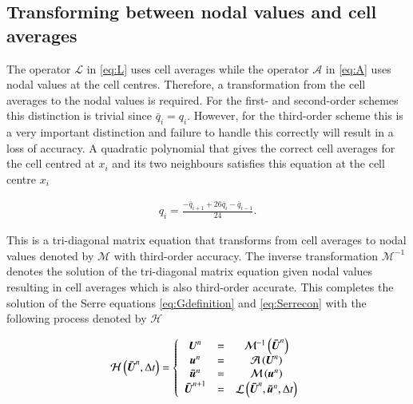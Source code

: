 \documentclass[SingleSpace,12pt]{Serre_ASCE}
\begin{document}
\subsection{Transforming between nodal values and cell averages} %
The operator $\mathcal{L}$ in \eqref{eq:L} uses cell averages while the operator $\mathcal{A}$ in \eqref{eq:A} uses nodal values at the cell centres. Therefore, a transformation from the cell averages to the nodal values is required. For the first- and second-order schemes this distinction is trivial since $\bar{q}_i = q_i$. However, for the third-order scheme this is a very important distinction and failure to handle this correctly will result in a loss of accuracy. A quadratic polynomial that gives the correct cell averages for the cell centred at $x_i$ and its two neighbours satisfies this equation at the cell centre $x_i$
\begin{linenomath*}
\begin{gather}\label{eq:midtoca}
q_i = \frac{- \bar{q}_{i+1} + 26\bar{q}_{i} - \bar{q}_{i-1}}{24}.
\end{gather}
\end{linenomath*}
This is a tri-diagonal matrix equation that transforms from cell averages to nodal values denoted by $\mathcal{M}$ with third-order accuracy. The inverse transformation $\mathcal{M}^{-1}$ denotes the solution of the tri-diagonal matrix equation given nodal values resulting in cell averages which is also third-order accurate. This completes the solution of the Serre equations \eqref{eq:Gdefinition} and \eqref{eq:Serrecon} with the following process denoted by $\mathcal{H}$
\begin{linenomath*}
\begin{gather}
\mathcal{H}\left(\boldsymbol{\bar{U}}^n,\Delta t \right) = \left\lbrace 
\begin{array}{c c c} 
	\boldsymbol{U}^n &=& \mathcal{M}^{-1}\left(\boldsymbol{\bar{U}}^n\right) \\
	\boldsymbol{u}^n &=& \mathcal{A}\left(\boldsymbol{U}^n\right) \\
	\boldsymbol{\bar{u}}^n &=&  \mathcal{M}\left(\boldsymbol{u}^n\right) \\
	\boldsymbol{\bar{U}}^{n+1} &=& \mathcal{L}\left(\boldsymbol{\bar{U}}^{n},\boldsymbol{\bar{u}}^n,\Delta t\right)							
\end{array} \right.
\end{gather}
\end{linenomath*}
\end{document}
